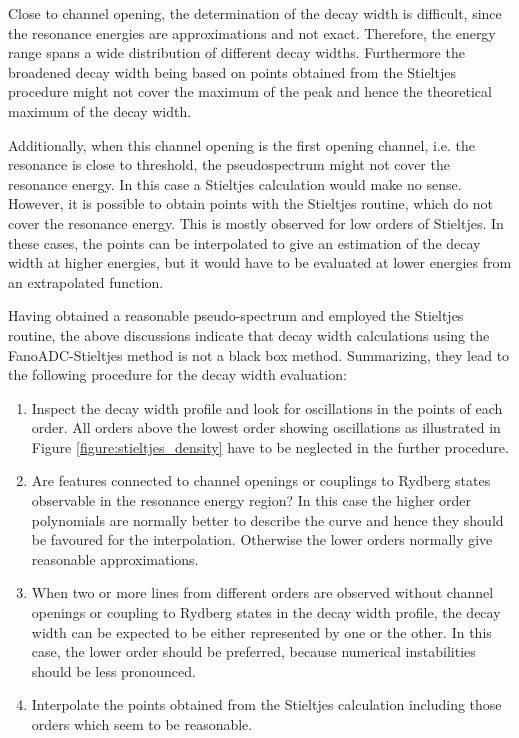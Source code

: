Close to channel opening, the determination of the decay width is difficult, since
the resonance energies are approximations and not exact. Therefore, the
energy range spans a wide distribution of different decay widths. Furthermore
the broadened decay width being based on points obtained from the Stieltjes
procedure might not cover the maximum of the peak and hence the theoretical
maximum of the decay width.

Additionally, when this channel opening is the first opening channel, i.e. the
resonance is close to threshold, the pseudospectrum might not cover the resonance energy.
In this case a Stieltjes calculation would make no sense. However, it is possible
to obtain points with the Stieltjes routine, which do not cover the resonance
energy.
This is mostly observed for low orders of Stieltjes. In these cases, the points
can be interpolated to give an estimation of the decay width at higher energies,
but it would have to be evaluated at lower energies from an extrapolated function.

Having obtained a reasonable pseudo-spectrum and employed the Stieltjes routine,
the above discussions indicate that decay width calculations using the FanoADC-Stieltjes
method is not a black box method. Summarizing, they lead to the
following procedure for the decay width evaluation:
\begin{enumerate}
 \item Inspect the decay width profile and look for oscillations in the
       points of each order. All orders above the lowest order showing oscillations as
       illustrated in Figure \ref{figure:stieltjes_density}
       have to be neglected in the further
       procedure.
 \item Are features connected to channel openings or couplings to Rydberg states
       observable in the resonance energy region? In this case the higher
       order polynomials are normally better to describe the curve and hence they
       should be favoured for the interpolation. Otherwise the lower orders
       normally give reasonable approximations.
 \item When two or more lines from different orders are observed without channel
       openings or coupling to Rydberg states in the decay width profile,
       the decay width can be expected to be either represented by one or the
       other. In this case, the lower order should be preferred, because
       numerical instabilities should be less pronounced.
 \item Interpolate the points obtained from the Stieltjes calculation including
       those orders which seem to be
       reasonable.
\end{enumerate}
